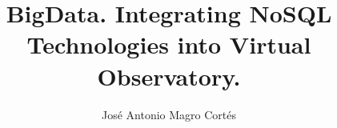 \documentclass[oneside,numbers,english]{ezthesis}
\author{Jos\'e Antonio Magro Cort\'es}
\title{BigData. Integrating NoSQL Technologies into Virtual Observatory.}
\begin{document}



\tableofcontents

%




\listoffigures
\listoftables








\appendix



\nocite{*}

\end{document}
